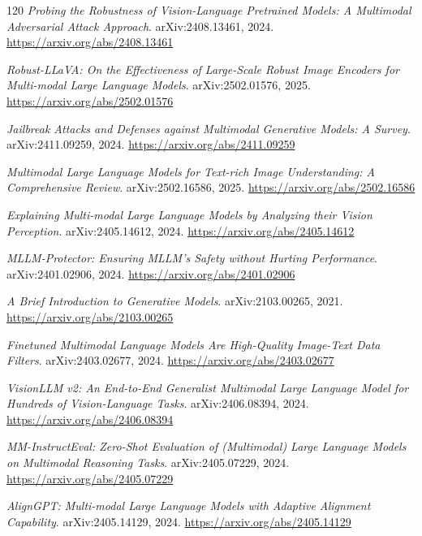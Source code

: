 \documentclass[11pt,a4paper]{article}
\begin{document}
\begin{thebibliography}{120}
\newblock \emph{Probing the Robustness of Vision-Language Pretrained Models: A Multimodal Adversarial Attack Approach}.
\newblock arXiv:2408.13461, 2024.
\newblock \url{https://arxiv.org/abs/2408.13461}

\newblock \emph{Robust-LLaVA: On the Effectiveness of Large-Scale Robust Image Encoders for Multi-modal Large Language Models}.
\newblock arXiv:2502.01576, 2025.
\newblock \url{https://arxiv.org/abs/2502.01576}

\newblock \emph{Jailbreak Attacks and Defenses against Multimodal Generative Models: A Survey}.
\newblock arXiv:2411.09259, 2024.
\newblock \url{https://arxiv.org/abs/2411.09259}

\newblock \emph{Multimodal Large Language Models for Text-rich Image Understanding: A Comprehensive Review}.
\newblock arXiv:2502.16586, 2025.
\newblock \url{https://arxiv.org/abs/2502.16586}

\newblock \emph{Explaining Multi-modal Large Language Models by Analyzing their Vision Perception}.
\newblock arXiv:2405.14612, 2024.
\newblock \url{https://arxiv.org/abs/2405.14612}

\newblock \emph{MLLM-Protector: Ensuring MLLM's Safety without Hurting Performance}.
\newblock arXiv:2401.02906, 2024.
\newblock \url{https://arxiv.org/abs/2401.02906}

\newblock \emph{A Brief Introduction to Generative Models}.
\newblock arXiv:2103.00265, 2021.
\newblock \url{https://arxiv.org/abs/2103.00265}

\newblock \emph{Finetuned Multimodal Language Models Are High-Quality Image-Text Data Filters}.
\newblock arXiv:2403.02677, 2024.
\newblock \url{https://arxiv.org/abs/2403.02677}

\newblock \emph{VisionLLM v2: An End-to-End Generalist Multimodal Large Language Model for Hundreds of Vision-Language Tasks}.
\newblock arXiv:2406.08394, 2024.
\newblock \url{https://arxiv.org/abs/2406.08394}

\newblock \emph{MM-InstructEval: Zero-Shot Evaluation of (Multimodal) Large Language Models on Multimodal Reasoning Tasks}.
\newblock arXiv:2405.07229, 2024.
\newblock \url{https://arxiv.org/abs/2405.07229}

\newblock \emph{AlignGPT: Multi-modal Large Language Models with Adaptive Alignment Capability}.
\newblock arXiv:2405.14129, 2024.
\newblock \url{https://arxiv.org/abs/2405.14129}


\end{thebibliography}
\end{document}
